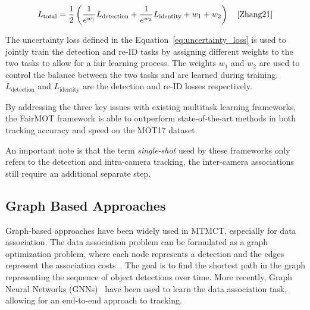 \begin{equation}
    \label{eq:uncertainty_loss}
    L_{\text{total}}=\frac{1}{2}\left(\frac{1}{e^{w_1}} L_{\text{detection}}+\frac{1}{e^{w_2}} L_{\text{identity}}+w_1+w_2\right)
    \quad\text{\cite[Eq.~5]{Zhang21}}
\end{equation}

The uncertainty loss defined in the Equation~\ref{eq:uncertainty_loss} is used to jointly train the detection and re-ID tasks by assigning different weights to the two tasks to allow for a fair learning process. The weights \(w_1\) and \(w_2\) are used to control the balance between the two tasks and are learned during training. \(L_{\text{detection}}\) and \(L_{\text{identity}}\) are the detection and re-ID losses respectively.

By addressing the three key issues with existing multitask learning frameworks, the FairMOT framework is able to outperform state-of-the-art methods in both tracking accuracy and speed on the MOT17 dataset.

An important note is that the term \textit{single-shot} used by these frameworks only refers to the detection and intra-camera tracking, the inter-camera associations still require an additional separate step.

\subsection{Graph Based Approaches}\label{subsec:graph_based_approaches}
Graph-based approaches have been widely used in MTMCT, especially for data association. The data association problem can be formulated as a graph optimization problem, where each node represents a detection and the edges represent the association costs~\cite{Zhang08}. The goal is to find the shortest path in the graph representing the sequence of object detections over time. More recently, Graph Neural Networks (GNNs)~\cite{Scarselli09} have been used to learn the data association task, allowing for an end-to-end approach to tracking.

